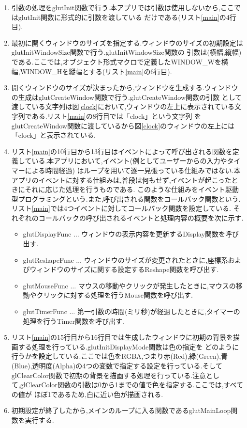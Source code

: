 \documentclass[a4j]{jarticle}
\begin{document}
  \begin{enumerate}
    \item 引数の処理をglutInit関数で行う.本アプリでは引数は使用しないから,ここではglutInit関数に形式的に引数を渡している
    だけである(リスト\ref{main}の4行目).
    \item 最初に開くウィンドウのサイズを指定する.ウィンドウのサイズの初期設定はglutInitWindowSize関数で行う.glutInitWindowSize関数の
    引数は(横幅,縦幅)である.ここでは,オブジェクト形式マクロで定義したWINDOW\_Wを横幅,WINDOW\_Hを縦幅とする(リスト\ref{main}の6行目).
    \item 開くウィンドウのサイズが決まったから,ウィンドウを生成する.ウィンドウの生成はglutCreateWindow関数で行う.glutCreateWindow関数の引数
    として渡している文字列は図\ref{clock}において,ウィンドウの左上に表示されている文字列である.リスト\ref{main}の8行目では「clock」という文字列
    をglutCreateWindow関数に渡しているから図\ref{clock}のウィンドウの左上には「clock」と表示されている.
    \item リスト\ref{main}の10行目から13行目はイベントによって呼び出される関数を定義している.本アプリにおいて,イベント(例としてユーザーからの入力やタイマーによる時間経過)
    はループを用いて逐一見張っている仕組みではない.本アプリのイベントに対する仕組みは,普段は何もせず,イベントが起こったときにそれに応じた処理を行うものである.
    このような仕組みをイベント駆動型プログラミングという.また,呼び出される関数をコールバック関数という.リスト\ref{main}では4つイベントに対してコールバック関数を設定している.
    それぞれのコールバックの呼び出されるイベントと処理内容の概要を次に示す.
    \begin{itemize}
      \item glutDisplayFunc $\dots$ ウィンドウの表示内容を更新するDisplay関数を呼び出す.
      \item glutReshapeFunc $\dots$ ウィンドウのサイズが変更されたときに,座標系およびウィンドウのサイズに関する設定するReshape関数を呼び出す.
      \item glutMouseFunc $\dots$ マウスの移動やクリックが発生したときに,マウスの移動やクリックに対する処理を行うMouse関数を呼び出す.
      \item glutTimerFunc $\dots$ 第一引数の時間(ミリ秒)が経過したときに,タイマーの処理を行うTimer関数を呼び出す.
    \end{itemize}
    \item リスト\ref{main}の15行目から16行目では生成したウィンドウに初期の背景を描画する処理を行っている.glutInitDisplayMode関数は色の指定を
    どのように行うかを設定している.ここでは色をRGBA,つまり赤(Red),緑(Green),青(Blue),透明度(Alpha)の4つの変数で指定する設定を行っている.そして
    glClearColor関数で初期の背景を描画する処理を行っている.注意として,glClearColor関数の引数は0から1までの値で色を指定する.ここでは,すべての値が
    ほぼ1であるため,白に近い色が描画される.
    \item 初期設定が終了したから,メインのループに入る関数であるglutMainLoop関数を実行する.
  \end{enumerate}
\end{document}
